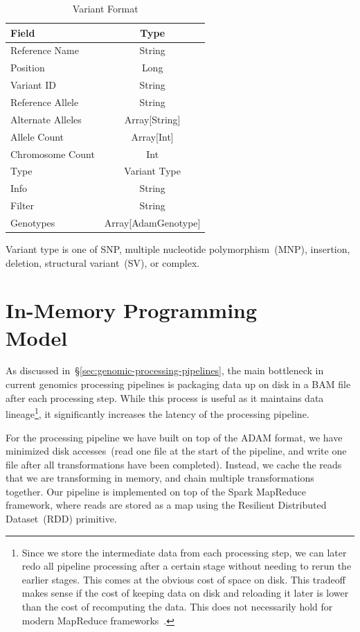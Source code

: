 \documentclass[10pt,twocolumn]{article}
\begin{document}
\begin{table}[h]
\caption{Variant Format}
\label{tab:variant-format}
\begin{center}
\begin{tabular}{| l | c |}
\hline
\bf Field & \bf Type \\
\hline
Reference Name & String \\
Position & Long \\
Variant ID & String \\
Reference Allele & String \\
Alternate Alleles & Array[String] \\
Allele Count & Array[Int] \\
Chromosome Count & Int \\
Type & Variant Type \\
Info & String \\
Filter & String \\
Genotypes & Array[AdamGenotype] \\
\hline
\end{tabular}
\end{center}
\end{table}

Variant type is one of SNP, multiple nucleotide polymorphism~(MNP), insertion, deletion, structural variant~(SV), or complex.

\section{In-Memory Programming\\Model}
\label{sec:in-memory-programming-model}

As discussed in~\S\ref{sec:genomic-processing-pipelines}, the main bottleneck in current genomics processing pipelines is
packaging data up on disk in a BAM file after each processing step. While this process is useful as it maintains data
lineage\footnote{Since we store the intermediate data from each processing step, we can later redo all pipeline processing
after a certain stage without needing to rerun the earlier stages. This comes at the obvious cost of space on disk. This tradeoff
makes sense if the cost of keeping data on disk and reloading it later is lower than the cost of recomputing the data. This
does not necessarily hold for modern MapReduce frameworks~\cite{zaharia12}.}, it significantly increases the latency of the
processing pipeline.

For the processing pipeline we have built on top of the ADAM format, we have minimized disk accesses~(read one file at the
start of the pipeline, and write one file after all transformations have been completed). Instead, we cache the reads that we are
transforming in memory, and chain multiple transformations together. Our pipeline is implemented on top of the Spark MapReduce
framework, where reads are stored as a map using the Resilient Distributed Dataset~(RDD) primitive.
\end{document}
